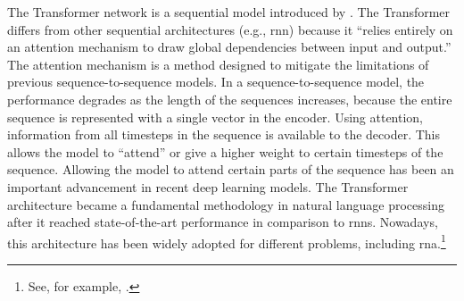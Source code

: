 

The Transformer network is a sequential model introduced by
\textcite[p.~2]{vaswani2017attention}. The Transformer
differs from other sequential architectures (e.g.,
\gls{rnn}) because it ``relies entirely on an attention
mechanism to draw global dependencies between input and
output.'' The attention mechanism is a method designed to
mitigate the limitations of previous sequence-to-sequence
models. In a sequence-to-sequence model, the performance
degrades as the length of the sequences increases, because
the entire sequence is represented with a single vector in
the encoder. Using attention, information from all timesteps
in the sequence is available to the decoder. This allows the
model to ``attend'' or give a higher weight to certain
timesteps of the sequence. Allowing the model to attend
certain parts of the sequence has been an important
advancement in recent deep learning models. The Transformer
architecture became a fundamental methodology in natural
language processing after it reached state-of-the-art
performance in comparison to \glspl{rnn}. Nowadays, this
architecture has been widely adopted for different problems,
including \gls{rna}.\footnote{See, for example,
\textcite{chen2021attend}.}
